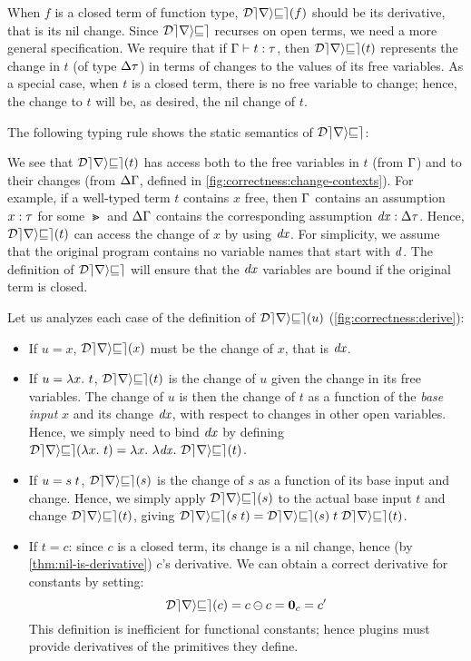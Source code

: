 When $f$ is a closed term of function type,
$\Derive{f}$ should be its derivative, that is its nil change.
Since $\mathcal{Derive}$ recurses on open terms, we need a more general
specification.
%
We require that if $\Typing{t}{\tau}$, then $\Derive{t}$
represents the change in $t$ (of type $\Change{\Gt}$) in terms of
changes to the values of its free variables. As a special case,
when $t$ is a closed term, there is no free variable to change;
hence, the change to $t$ will be, as desired, the nil change of
$t$.

The following typing rule shows the static semantics of
$\mathcal{Derive}$:
\begin{typing}
  {}
\end{typing}

We see that $\Derive{t}$ has access both to the
free variables in $t$ (from $\Gamma$) and to their changes (from
$\Delta \Gamma$, defined in
\cref{fig:correctness:change-contexts}).
For example, if a
well-typed term $t$ contains $x$ free, then $\Gamma$ contains an
assumption $\HasType{x}{\Gt}$ for some $\Gt$ and
$\Delta \Gamma$ contains the corresponding assumption
$\HasType{\D x}{\DeltaType{\Gt}}$. Hence, $\Derive{t}$ can
access the change of $x$ by using $\mathit{dx}$. For simplicity, 
we assume that the original program contains no variable names
that start with $\mathit{d}$.
The definition of $\mathcal{Derive}$ will ensure that
the $\mathit{dx}$ variables are bound if the original term is closed.

Let us analyzes each case of the definition of $\Derive{u}$
(\cref{fig:correctness:derive}):
\begin{itemize}
\item If $u = x$, $\Derive{x}$ must be the change of $x$, that is
$\mathit{dx}$.
\item If $u = \Lam{x}{t}$, $\Derive{t}$ is the change of
  $u$ given the change in its free variables. The change of $u$
  is then the change of $t$ as a function of the \emph{base input}
  $x$ and its change
  $\mathit{dx}$, with respect to changes in other open variables. Hence,
  we simply need to bind $\mathit{dx}$ by defining $\Derive{\Lam{x}{t}}
  = \Lam{x}{\Lam{\D x}{\Derive{t}}}$.
\item If $u = \App{s}{t}$, $\Derive{s}$ is the change of $s$ as a function
  of its base input and change. Hence, we simply apply $\Derive{s}$ to 
  the actual base input $t$ and change $\Derive{t}$, giving
  $\Derive{\App{s}{t}} =
  \App{\App{\Derive{s}}{t}}{\Derive{t}}$.
\item If $t = c$: since $c$ is a closed term, its
  change is a nil change, hence (by \cref{thm:nil-is-derivative}) $c$'s derivative. We can
  obtain a correct derivative for constants by setting:
  \[
  \Derive{c} =
  \Diff{c}{c} = \NilC{c} = c'
  \]
  This definition is inefficient for functional constants; hence plugins must provide derivatives
  of the primitives they define.
\end{itemize}

